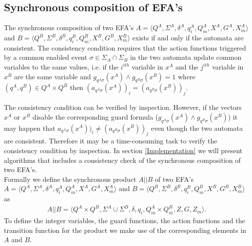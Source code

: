 \documentclass{article}
\begin{document}
\subsection{Synchronous composition of EFA's}
The synchronous composition of two EFA's $A=\langle Q^A, \Sigma^A,
\delta^A, q^A_i, Q^A_m, X^{A}, G^A, X^A_m \rangle$ and $B=\langle
Q^B, \Sigma^B, \delta^B, q^B_i, Q^B_m, X^{B}, G^B, X^B_m \rangle$
exists if and only if the automata are consistent. The consistency
condition requires that the action functions triggered by a common
enabled event $\sigma\in \Sigma_{A}\cap \Sigma_{B}$ in the two
automata update common variables to the same values, i.e. if the
$i^{ith}$ variable in $x^{A}$ and the $j^{ith}$ variable in
$x^{B}$ are the same variable and $g_{q^A \sigma}(x^{A})\wedge
g_{q^B \sigma}(x^{B})=1$ where $(q^A,q^B)\in Q^A\times Q^B$ then
$(a_{q^A \sigma}(x^{A}))_i = (a_{q^B \sigma}(x^{B}))_j$.

The consistency condition can be verified by inspection. However,
if the vectors $x^{A}$ or $x^{B}$ disable the corresponding guard
formula ($g_{q^A \sigma}(x^{A})\wedge g_{q^B \sigma}(x^{B})$) it
may happen that $a_{q^A \sigma}(x^{A}))_i \neq (a_{q^B
\sigma}(x^{B}))_j$ even though the two automata are consistent.
Therefore it may be a time-consuming task to verify the
consistency condition by inspection. In section
\ref{Implementation} we will present algorithms that includes a
consistency check of the synchronous
composition of two EFA's. \\



 Formally we define the synchronous product $A||B$ of two EFA's
$A=\langle Q^A, \Sigma^A, \delta^A, q^A_i, Q^A_m, X^{A}, G^A,X^A_m
\rangle$ and $B=\langle Q^B, \Sigma^B, \delta^B, q^B_i, Q^B_m,
X^{B}, G^B,X^B_m
 \rangle$ as
\begin{eqnarray}
A||B=\langle Q^A\times Q^B, \Sigma^A \cup \Sigma^B , \delta, q_i,
Q^A_m\times Q^B_m, Z, G, Z_m \rangle.
\end{eqnarray}
To define the integer variables, the guard functions, the action
functions and the transition function for the product we make use
of the corresponding elements in $A$ and $B$.
\end{document}
